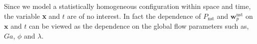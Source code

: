 

Since we model a statistically homogeneous configuration within space and time, the variable \textbf{x} and $t$ are of no interest.
In fact the dependence of $P_\text{nst}$ and $\textbf{w}_p^\text{nst}$ on $\textbf{x}$ and $t$ can be viewed as the dependence on the global flow parameters such as,  $Ga$, $\phi$ and $\lambda$. 


